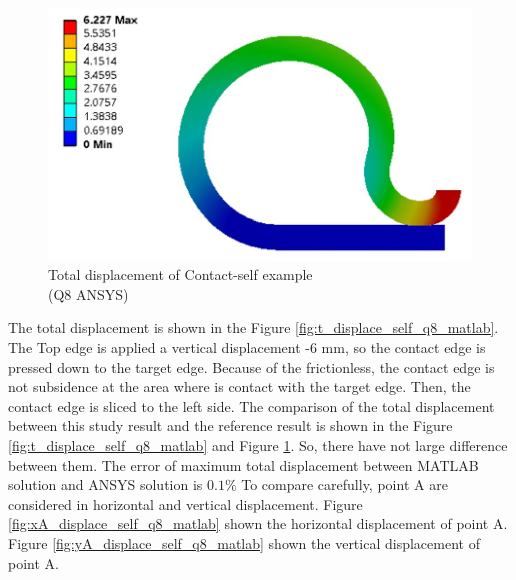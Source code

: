 \begin{figure}[H]
    \centering
    \includegraphics[scale=0.5]{Figures/t_displace_self_q8_ansys.jpg}
    \decoRule   
    \caption{Total displacement of Contact-self example \\ (Q8 ANSYS)}
    \label{fig:t_displace_self_q8_ansys}
\end{figure} \noindent
The total displacement is shown in the Figure \ref{fig:t_displace_self_q8_matlab}.
The Top edge is applied a vertical displacement -6 mm, so the contact edge is pressed down to the target edge. Because of the frictionless, the contact edge is not subsidence at the area where is contact with the target edge.
Then, the contact edge is sliced to the left side.
\vspace{0.38cm} \newline
The comparison of the total displacement between this study result and the reference result
is shown in the Figure \ref{fig:t_displace_self_q8_matlab} and Figure \ref{fig:t_displace_self_q8_ansys}.
So, there have not large difference between them.
The error of maximum total displacement between MATLAB solution and ANSYS solution is $0.1\%$
\newpage 
\noindent
To compare carefully, point A are considered in horizontal and vertical displacement. 
Figure \ref{fig:xA_displace_self_q8_matlab} shown the horizontal displacement of point A. 
Figure \ref{fig:yA_displace_self_q8_matlab} shown the vertical displacement of point A.
\vspace{0.38cm}
